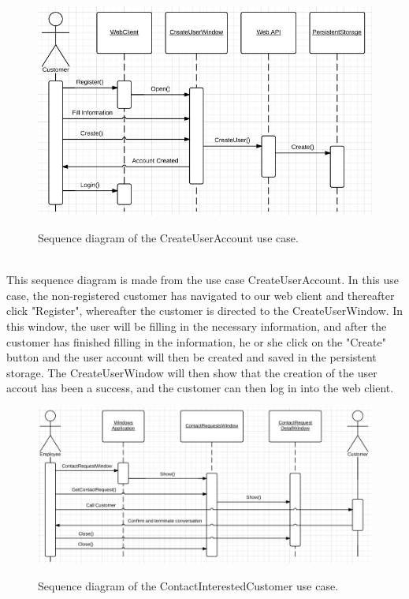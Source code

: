 \begin{figure}[H]
	\centering
		\includegraphics[width=\textwidth]{Figures/SequenceDiagram-CreateUserAccount}\\
	\caption{Sequence diagram of the CreateUserAccount use case.}
  \label{fig:SequenceDiagram-CreateUserAccount}
\end{figure}
\\
This sequence diagram is made from the use case CreateUserAccount. In this use case, the non-registered customer has navigated to our web client and thereafter click "Register", whereafter the customer is directed to the CreateUserWindow. In this window, the user will be filling in the necessary information, and after the customer has finished filling in the information, he or she click on the "Create" button and the user account will then be created and saved in the persistent storage. The CreateUserWindow will then show that the creation of the user accout has been a success, and the customer can then log in into the web client.
\\
\begin{figure}[H]
	\centering
		\includegraphics[width=\textwidth]{Figures/SequenceDiagram-ContactInterestedCustomer}\\
	\caption{Sequence diagram of the ContactInterestedCustomer use case.}
  \label{fig:SequenceDiagram-ContactInterestedCustomer}
\end{figure}
